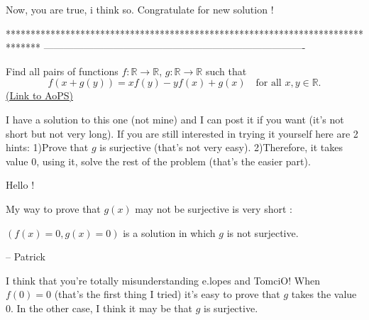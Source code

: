 \begin{mysolution}
	Now, you are true, i think so. Congratulate for new solution !  
\end{mysolution}
*******************************************************************************
-------------------------------------------------------------------------------

\begin{problem}
	Find all pairs of functions $ f : \mathbb R \to \mathbb R$, $g : \mathbb R \to \mathbb R$ such that \[f \left( x + g(y) \right) = xf(y) - y  f(x) + g(x) \quad\text{for all } x, y\in\mathbb{R}.\]
	\flushright \href{https://artofproblemsolving.com/community/c6h148108}{(Link to AoPS)}
\end{problem}



\begin{mysolution}
	I have a solution to this one (not mine) and I can post it if you want (it's not short but not very long).
If you are still interested in trying it yourself here are 2 hints:
1)Prove that $g$ is surjective (that's not very easy).
2)Therefore, it takes value $0$, using it, solve the rest of the problem (that's the easier part).
\end{mysolution}



\begin{mysolution}
	Hello !

My way to prove that $g(x)$ may not be surjective is very short :

$(f(x)=0, g(x)=0)$ is a solution in which $g$ is not surjective.

-- 
Patrick
\end{mysolution}



\begin{mysolution}
	I think that you're totally misunderstanding e.lopes and TomciO! When $f(0) = 0$ (that's the first thing I tried) it's easy to prove that $g$ takes the value $0$. In the other case, I think it may be that $g$ is surjective.
\end{mysolution}



